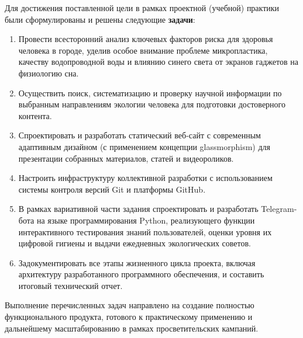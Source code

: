 Для достижения поставленной цели в рамках проектной (учебной) практики были сформулированы и решены следующие \textbf{задачи}:
\begin{enumerate}
    \item Провести всесторонний анализ ключевых факторов риска для здоровья человека в городе, уделив особое внимание проблеме микропластика, качеству водопроводной воды и влиянию синего света от экранов гаджетов на физиологию сна.
    \item Осуществить поиск, систематизацию и проверку научной информации по выбранным направлениям экологии человека для подготовки достоверного контента.
    \item Спроектировать и разработать статический веб-сайт с современным адаптивным дизайном (с применением концепции glassmorphism) для презентации собранных материалов, статей и видеороликов.
    \item Настроить инфраструктуру коллективной разработки с использованием системы контроля версий Git и платформы GitHub.
    \item В рамках вариативной части задания спроектировать и разработать Telegram-бота на языке программирования Python, реализующего функции интерактивного тестирования знаний пользователей, оценки уровня их цифровой гигиены и выдачи ежедневных экологических советов.
    \item Задокументировать все этапы жизненного цикла проекта, включая архитектуру разработанного программного обеспечения, и составить итоговый технический отчет.
\end{enumerate}

Выполнение перечисленных задач направлено на создание полностью функционального продукта, готового к практическому применению и дальнейшему масштабированию в рамках просветительских кампаний.
